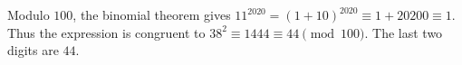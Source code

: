 Modulo $100$, the binomial theorem gives $11^{2020}=(1+10)^{2020}\equiv1+20200\equiv1$. Thus the expression is congruent to $38^2\equiv1444\equiv44\pmod{100}$. The last two digits are $\boxed{44}$.
